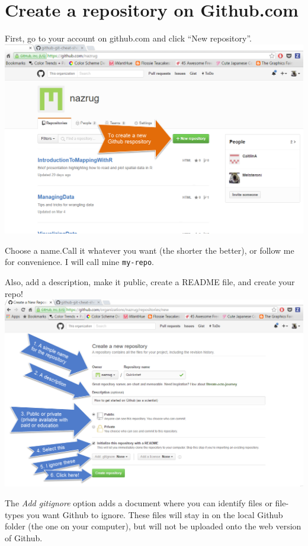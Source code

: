 \documentclass[]{book}
\theoremstyle{definition}
\theoremstyle{definition}
\theoremstyle{definition}
\theoremstyle{remark}
\begin{document}
\section{Create a repository on
Github.com}\label{create-a-repository-on-github.com}

First, go to your account on github.com and click ``New repository''.
\includegraphics{img/create_repository.png}

Choose a name.Call it whatever you want (the shorter the better), or
follow me for convenience. I will call mine \texttt{my-repo}.

Also, add a description, make it public, create a README file, and
create your repo! \includegraphics{img/create_repository_2.png}

The \emph{Add gitignore} option adds a document where you can identify
files or file-types you want Github to ignore. These files will stay in
on the local Github folder (the one on your computer), but will not be
uploaded onto the web version of Github.
\end{document}
